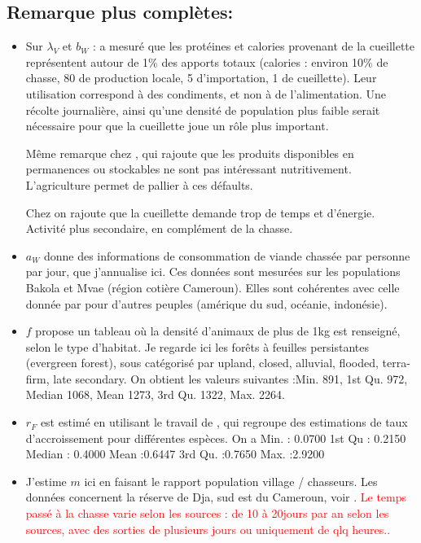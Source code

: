 \documentclass{article}
\newcommand{\lvw}{\lambda_{V}}
\newcommand{\marc}[1]{\textcolor{red}{#1}}
\begin{document}
\subsection{Remarque plus complètes:}
\begin{itemize}
\item Sur $\lvw$ et $b_W$ : \cite{koppert_consommation_1996} a mesuré que les protéines et calories provenant de la cueillette représentent autour de 1\% des apports totaux (calories : environ 10\% de chasse, 80 de production locale, 5 d'importation, 1 de cueillette). Leur utilisation correspond à des condiments, et non à de l'alimentation. Une récolte journalière, ainsi qu'une densité de population plus faible serait nécessaire pour que la cueillette joue un rôle plus important.

Même remarque chez \cite{loung_pygmees_1996}, qui rajoute que les produits disponibles en permanences ou stockables ne sont pas intéressant nutritivement.
L'agriculture permet de pallier à ces défaults.

Chez \cite{bennett_carrying_2000} on rajoute que la cueillette demande trop de temps et d'énergie. Activité plus secondaire, en complément de la chasse.

\item $a_W$ \cite{koppert_consommation_1996} donne des informations de consommation de viande chassée par personne par jour, que j'annualise ici. Ces données sont mesurées sur les populations Bakola et Mvae (région cotière Cameroun). Elles sont cohérentes avec celle donnée par \cite{bennett_carrying_2000} pour d'autres peuples (amérique du sud, océanie, indonésie).

\item $f$ \cite{bennett_carrying_2000} propose un tableau où la densité d'animaux de plus de 1kg est renseigné, selon le type d'habitat. Je regarde ici les forêts à feuilles persistantes (evergreen forest), sous catégorisé par upland, closed, alluvial, flooded, terra-firm, late secondary. On obtient les valeurs suivantes :Min. 891, 1st Qu. 972,  Median 1068,    Mean 1273, 3rd Qu. 1322,   Max. 2264.

\item $r_F$ est estimé en utilisant le travail de \cite{bennett_carrying_2000}, qui regroupe des estimations de taux d'accroissement pour différentes espèces. On a 
 Min. : 0.0700 1st Qu : 0.2150  Median : 0.4000    Mean :0.6447 3rd Qu. :0.7650   Max. :2.9200 
 
\item J'estime $m$ ici en faisant le rapport population village / chasseurs. Les données concernent la réserve de Dja, sud est du Cameroun, voir \cite{avila_interpreting_2019}.
\marc{Le temps passé à la chasse varie selon les sources : de 10 à 20jours par an selon les sources, avec des sorties de plusieurs jours ou uniquement de qlq heures..}


\end{itemize}
\end{document}
